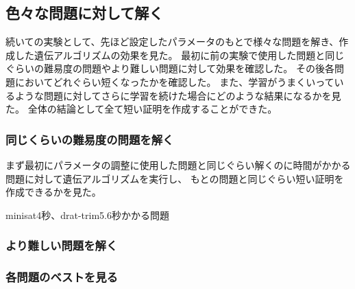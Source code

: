 








\subsection{色々な問題に対して解く}%



続いての実験として、先ほど設定したパラメータのもとで様々な問題を解き、作成した遺伝アルゴリズムの効果を見た。
最初に前の実験で使用した問題と同じぐらいの難易度の問題やより難しい問題に対して効果を確認した。
その後各問題においてどれぐらい短くなったかを確認した。
また、学習がうまくいっているような問題に対してさらに学習を続けた場合にどのような結果になるかを見た。
全体の結論として全て短い証明を作成することができた。



\subsubsection{同じくらいの難易度の問題を解く}

まず最初にパラメータの調整に使用した問題と同じぐらい解くのに時間がかかる問題に対して遺伝アルゴリズムを実行し、
もとの問題と同じぐらい短い証明を作成できるかを見た。

minisat4秒、drat-trim5.6秒かかる問題



\subsubsection{より難しい問題を解く}



\subsubsection{各問題のベストを見る}



